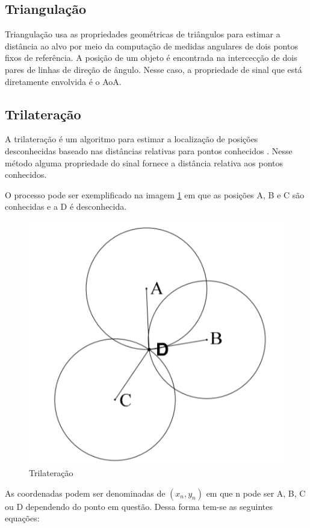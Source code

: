 \subsection{Triangulação}
Triangulação usa as propriedades geométricas de triângulos para estimar a distância ao alvo por meio da computação de medidas angulares de dois pontos fixos de referência.
A posição de um objeto é encontrada na intercecção de dois pares de linhas de direção de ângulo.
Nesse caso, a propriedade de sinal que está diretamente envolvida é o AoA.

\subsection{Trilateração}
A trilateração é um algoritmo para estimar a localização de posições desconhecidas baseado nas distâncias relativas para pontos conhecidos \cite{art12}.
Nesse método alguma propriedade do sinal fornece a distância relativa aos pontos conhecidos.

O processo pode ser exemplificado na imagem \ref{fig:trilateration.png} em que as posições A, B e C são conhecidas e a D é desconhecida. 
\begin{figure}[H]
	\centering 
	\includegraphics[scale = 1]{images/trilateration.png}
	\caption{Trilateração \cite{art12}}
	\label{fig:trilateration.png}
\end{figure}


As coordenadas podem ser denominadas de \( (x_n, y_n) \) em que n pode ser A, B, C ou D dependendo do ponto em questão. Dessa forma tem-se as seguintes equações:


